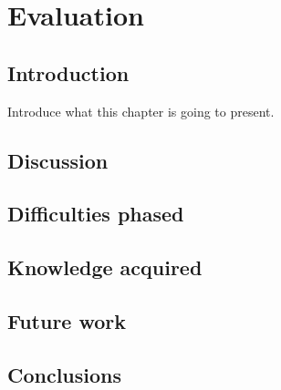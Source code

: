 \chapter{Evaluation}

\section{Introduction}
Introduce what this chapter is going to present.
\section{Discussion}

\section{Difficulties phased}

\section{Knowledge acquired}

\section{Future work}

\section{Conclusions}
